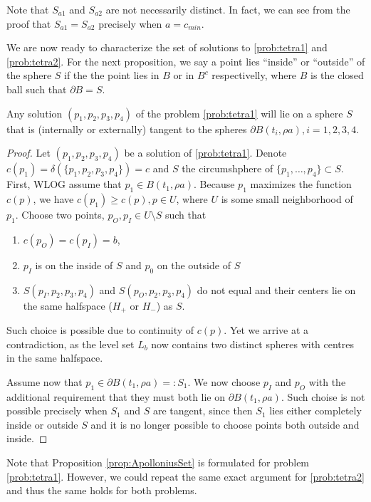 Note that $S_{a1}$ and $S_{a2}$ are not necessarily distinct. In fact, we can see from the proof that $S_{a1}=S_{a2}$ precisely when $a=c_{min}$.


We are now ready to characterize the set of solutions to \ref{prob:tetra1} and \ref{prob:tetra2}. For the next proposition, we say a point lies ``inside'' or ``outside'' of the sphere $S$ if the the point lies in $B$ or in $B^c$ respectivelly, where $B$ is the closed ball such that $\partial B = S$.


\begin{proposition}\label{prop:ApolloniusSet}
Any solution $(p_1,p_2,p_3,p_4)$ of the problem \ref{prob:tetra1} will lie on a sphere $S$ that is (internally or externally) tangent to the spheres $\partial B(t_i,\rho a), i =1,2,3,4$. 
\end{proposition}
\begin{proof}
	Let $(p_1,p_2,p_3,p_4)$ be a solution of \ref{prob:tetra1}. Denote $c(p_1)=\delta(\{p_1,p_2,p_3,p_4\})=c$ and $S$ the circumshphere of $\{p_1,\dots,p_4\}\subset S$. 
	First, WLOG assume that $p_1 \in B(t_1,\rho a)$. Because $p_1$ maximizes the function $c(p)$, we have $c(p_1)\geq c(p), p\in U$, where $U$ is some small neighborhood of $p_1$. Choose two points, $p_O,p_I\in U\setminus S$ such that 
\begin{enumerate} 
\item $c(p_O)=c(p_I)=b$,
\item $p_I$ is on the inside of $S$ and $p_0$ on the outside of $S$ 
\item {}$S(p_I,p_2,p_3,p_4)$ and $S(p_O,p_2,p_3,p_4)$ do not equal and their centers lie on the same halfspace ($H_+$ or $H_-$) as $S$. 
\end{enumerate}
Such choice is possible due to continuity of $c(p)$. Yet we arrive at a contradiction, as the level set $L_b$ now contains two distinct spheres with centres in the same halfspace. 

Assume now that $p_1 \in \partial B(t_1,\rho a)=: S_1$. We now choose $p_I$ and $p_O$ with the additional requirement that they must both lie on $\partial B(t_1,\rho a)$. Such choise is not possible precisely when $S_1$ and $S$ are tangent, since then  $S_1$ lies either completely inside or outside $S$ and it is no longer possible to choose points both outside and inside. 
\end{proof}
Note that Proposition \ref{prop:ApolloniusSet} is formulated for problem \ref{prob:tetra1}. However, we could repeat the same exact argument for \ref{prob:tetra2} and thus the same holds for both problems.\newline


